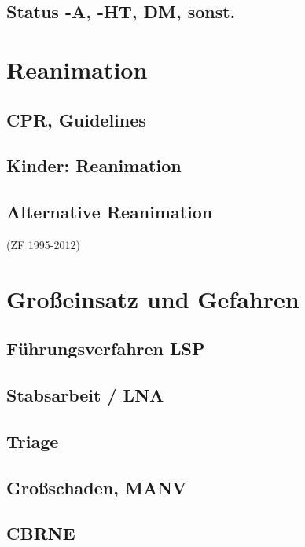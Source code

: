 \clearpage
\section{Status -A, -HT, DM, sonst.}

\chapter{Reanimation}

\clearpage
\section{CPR, Guidelines}

\clearpage
\section{Kinder: Reanimation}

\clearpage
\section{Alternative Reanimation }
(ZF 1995-2012)

\chapter{Großeinsatz und Gefahren}

\clearpage
\section{Führungsverfahren LSP}

\clearpage
\section{Stabsarbeit / LNA}

\clearpage
\section{Triage}

\clearpage
\section{Großschaden, MANV}

\clearpage
\section{CBRNE}

